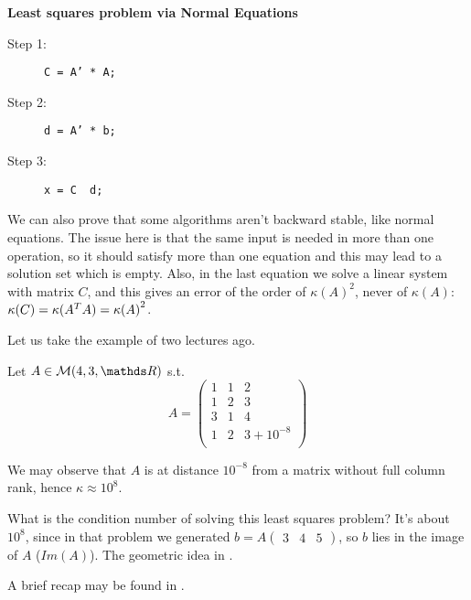 \documentclass[computational_mathematics.tex]{subfiles}
\begin{document}
\textbf{Least squares problem via Normal Equations}
\begin{description}
  \item[{\sc Step 1:}] \texttt{C = A' * A;}
  \item[{\sc Step 2:}] \texttt{d = A' * b;}
  \item[{\sc Step 3:}] \texttt{x = C \ d;}
\end{description}

We can also prove that some algorithms aren't backward stable, like normal equations. The issue here is that the same input is needed in more than one operation, so it should satisfy more than one equation and this may lead to a solution set which is empty. Also, in the last equation we solve a linear system with matrix $C$, and this gives an error of the order of ${\kappa(A)}^2$, never of $\kappa(A)$: $\kappa(C) = \kappa({A}^{T} A) = {\kappa(A)}^2$.

Let us take the example of two lectures ago.

\begin{example}
   Let $A \in \mathcal{M}(4, 3, \R)$ s.t.
   \[
  A = \begin{pmatrix}
    1&1&2\\
    1&2&3\\
    3&1&4\\
    1&2& 3 + 10^{-8}\\
  \end{pmatrix}
    \]

    We may observe that $A$ is at distance $10^{-8}$ from a matrix without full column rank, hence $\kappa \approx 10^8$.  

  What is the condition number of solving this least squares problem?
  It's about $10^8$, since in that problem we generated $b= A \begin{pmatrix} 3 & 4 & 5 \end{pmatrix}$, so $b$ lies in the image of $A$ ($Im(A)$). The geometric idea in .

\end{example}

A brief recap may be found in .
\end{document}
